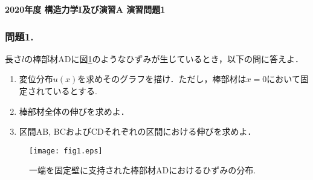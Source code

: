 \documentclass[10pt,a4j]{jarticle}
\newlength{\minitwocolumn}
\begin{document}
\newcommand{\fat}[1]{\mbox{\boldmath $#1$}}
\newcommand{\D}{\partial}
\newcommand{\w}{\omega}
\newcommand{\ga}{\alpha}
\newcommand{\gb}{\beta}
\newcommand{\gx}{\xi}
\newcommand{\gz}{\zeta}
\newcommand{\vhat}[1]{\hat{\fat{#1}}}
\newcommand{\spc}{\vspace{0.7\baselineskip}}
\newcommand{\halfspc}{\vspace{0.3\baselineskip}}

\pagestyle{empty}
\newcommand{\twofig}[2]
 {
   \begin{figure}
     \begin{minipage}[t]{\minitwocolumn}
         \begin{center}   #1
         \end{center}
     \end{minipage}
         \hspace{\columnsep}
     \begin{minipage}[t]{\minitwocolumn}
         \begin{center} #2
         \end{center}
     \end{minipage}
   \end{figure}
 }
\begin{center}
	{\Large \bf 2020年度 構造力学I及び演習A 演習問題1} \\
\end{center}
\subsubsection*{問題1.}
長さ$l$の棒部材ADに図\ref{fig:fig1}のようなひずみが生じているとき，以下の問に答えよ．
\begin{enumerate}
\item
	変位分布$u(x)$を求めそのグラフを描け．ただし，棒部材は$x=0$において固定されているとする.
\item
	棒部材全体の伸びを求めよ．
\item
	区間AB, BCおよびCDそれぞれの区間における伸びを求めよ．
\end{enumerate}
\begin{figure}[h]
	\vspace{-3mm}
	\begin{center}
	\texttt{[image: fig1.eps]} 
	\end{center}
	\vspace{-5mm}
	\caption{一端を固定壁に支持された棒部材ADにおけるひずみの分布.} 
	\label{fig:fig1}
\end{figure}
	\vspace{-5mm}
\end{document}

